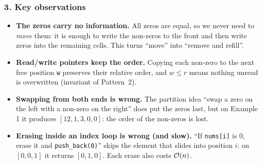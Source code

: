 \subsubsection*{3. Key observations}

\begin{itemize}[leftmargin=*]
    \item \textbf{The zeros carry no information.} All zeros are equal, so we never need to \emph{move} them: it is enough to write the non-zeros to the front and then write zeros into the remaining cells. This turns ``move'' into ``remove and refill''.
    \item \textbf{Read/write pointers keep the order.} Copying each non-zero to the next free position \texttt{w} preserves their relative order, and $w \le r$ means nothing unread is overwritten (invariant of Pattern~2).
    \item \textbf{Swapping from both ends is wrong.} The partition idea ``swap a zero on the left with a non-zero on the right'' does put the zeros last, but on Example 1 it produces $[12, 1, 3, 0, 0]$: the order of the non-zeros is lost.
    \item \textbf{Erasing inside an index loop is wrong (and slow).} ``If \texttt{nums[i]} is 0, erase it and \texttt{push\_back(0)}'' skips the element that slides into position $i$: on $[0, 0, 1]$ it returns $[0, 1, 0]$. Each erase also costs $\mathcal{O}(n)$.
\end{itemize}

\begin{diagrambox}
\end{diagrambox}

